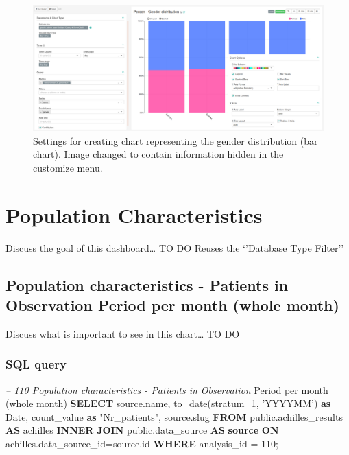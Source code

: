 \documentclass[]{book}
\newenvironment{Shaded}{\begin{snugshade}}{\end{snugshade}}
\newcommand{\KeywordTok}[1]{\textcolor[rgb]{0.13,0.29,0.53}{\textbf{#1}}}
\newcommand{\DataTypeTok}[1]{\textcolor[rgb]{0.13,0.29,0.53}{#1}}
\newcommand{\DecValTok}[1]{\textcolor[rgb]{0.00,0.00,0.81}{#1}}
\newcommand{\StringTok}[1]{\textcolor[rgb]{0.31,0.60,0.02}{#1}}
\newcommand{\CommentTok}[1]{\textcolor[rgb]{0.56,0.35,0.01}{\textit{#1}}}
\newcommand{\OtherTok}[1]{\textcolor[rgb]{0.56,0.35,0.01}{#1}}
\newcommand{\FunctionTok}[1]{\textcolor[rgb]{0.00,0.00,0.00}{#1}}
\newcommand{\NormalTok}[1]{#1}
\begin{document}
\begin{figure}
\includegraphics[width=1\linewidth]{images/personGenderDistribution} \caption{Settings for creating chart representing the gender distribution (bar chart). Image changed to contain information hidden in the customize menu.}\label{fig:personGenderDistribution}
\end{figure}

\chapter{Population Characteristics}\label{population-characteristics}

Discuss the goal of this dashboard\ldots{} TO DO Reuses the `'Database
Type Filter''

\section{Population characteristics - Patients in Observation Period per
month (whole
month)}\label{population-characteristics---patients-in-observation-period-per-month-whole-month}

Discuss what is important to see in this chart\ldots{} TO DO

\subsection{SQL query}\label{sql-query-10}

\begin{Shaded}
\begin{Highlighting}[]
\CommentTok{-- 110    Population characteristics - Patients in Observation }
\NormalTok{    Period per }\DataTypeTok{month}\NormalTok{ (whole }\DataTypeTok{month}\NormalTok{)}
\KeywordTok{SELECT}\NormalTok{ source.name, }
       \FunctionTok{to_date}\NormalTok{(stratum_1, }\StringTok{'YYYYMM'}\NormalTok{) }\KeywordTok{as} \DataTypeTok{Date}\NormalTok{,}
\NormalTok{       count_value }\KeywordTok{as} \OtherTok{"Nr_patients"}\NormalTok{,}
\NormalTok{       source.slug}
\KeywordTok{FROM}\NormalTok{ public.achilles_results }\KeywordTok{AS}\NormalTok{ achilles }\KeywordTok{INNER} \KeywordTok{JOIN} 
\NormalTok{    public.data_source }\KeywordTok{AS} \KeywordTok{source} \KeywordTok{ON}\NormalTok{ achilles.data_source_id=source.id}
\KeywordTok{WHERE}\NormalTok{ analysis_id = }\DecValTok{110}\NormalTok{;}
\end{Highlighting}
\end{Shaded}
\end{document}
